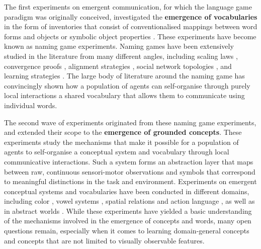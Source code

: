\documentclass[a4paper,abstract]{scrartcl}
\begin{document}
The first experiments on emergent communication, for which the language game paradigm was originally conceived, investigated the \textbf{emergence of vocabularies} in the form of inventories that consist of conventionalised mappings between word forms and objects or symbolic object properties \citep{steels1995self}. These experiments have become known as naming game experiments.  Naming games have been extensively studied in the literature from many different angles, including scaling laws \citep{baronchelli2006sharp}, convergence proofs \citep{devylder2006reach}, alignment strategies \citep{wellens2012adaptive},  social network topologies \citep{liu2009naming,lipowska2012naming}, and learning strategies \citep{schueller2016active}. The large body of literature around the naming game has convincingly shown how a population of agents can self-organise through purely local interactions a shared vocabulary that allows them to communicate using individual words.
 
The second wave of experiments originated from these naming game experiments, and extended their scope to the \textbf{emergence of grounded concepts}. These experiments study the mechanisms that make it possible for a population of agents to self-organise a conceptual system and vocabulary through local communicative interactions. Such a system forms an abstraction layer that maps between raw, continuous sensori-motor observations and symbols that correspond to meaningful distinctions in the task and environment. Experiments on emergent conceptual systems and vocabularies have been conducted in different domains, including color \citep{steels2005coordinating,puglisi2008cultural}, vowel systems \citep{de2000self,oudeyer2001coupled}, spatial relations \citep{spranger2012coevolution} and action language \citep{steels2012emergent}, as well as in abstract worlds \citep{spranger2016referential}. While these experiments have yielded a basic understanding of the mechanisms involved in the emergence of concepts and words, many open questions remain, especially when it comes to learning domain-general concepts and concepts that are not limited to visually observable features.  
\end{document}
